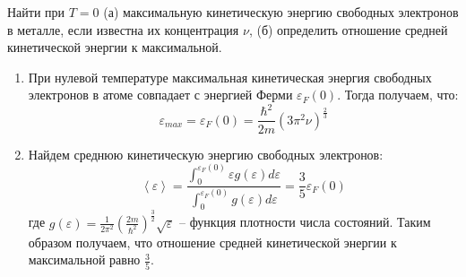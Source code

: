 \documentclass[__main__.tex]{subfiles}
\begin{document}
Найти при $T=0$ (а) максимальную кинетическую энергию свободных электронов в металле, если известна их концентрация $\nu$, (б) определить отношение средней кинетической энергии к максимальной.\\

\begin{enumerate}
    \item
          При нулевой температуре максимальная кинетическая энергия свободных электронов в атоме совпадает с энергией Ферми $\varepsilon_F(0)$. Тогда получаем, что:
          $$
              \varepsilon_{max} = \varepsilon_F(0) = \frac{\hbar^2}{2m}(3\pi^2\nu)^{\frac{2}{3}}
          $$
    \item
          Найдем среднюю кинетическую энергию свободных электронов:
          $$
              \left<\varepsilon\right>=\frac{\int_0^{\varepsilon_F(0)}\varepsilon g(\varepsilon) d\varepsilon}{\int_0^{\varepsilon_F(0)}g(\varepsilon) d\varepsilon} = \frac{3}{5}\varepsilon_F(0)
          $$
          где $g(\varepsilon) = \frac{1}{2\pi^2}\left(\frac{2m}{\hbar^2}\right)^{\frac{3}{2}}\sqrt{\varepsilon}$ -- функция плотности числа состояний. Таким образом получаем, что отношение средней кинетической энергии к максимальной равно $\frac{3}{5}$.
\end{enumerate}
\end{document}
